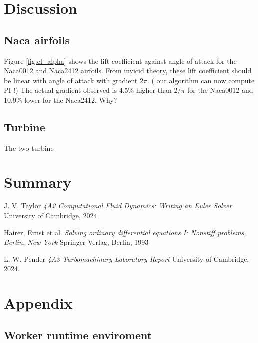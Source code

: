 \documentclass{article}
\begin{document}
\section{Discussion}

\subsection{Naca airfoils}

Figure \ref{fig:cl_alpha} shows the lift coefficient against angle of attack for the Naca0012 and Naca2412 airfoils.
From invicid theory, these lift coefficient should be linear with angle of attack with gradient $ 2\pi $. ( our algorithm can now compute PI !)
The actual gradient observed is 4.5\% higher than $2/\pi$ for the Naca0012 and 10.9\% lower for the Naca2412.
Why?

\subsection{Turbine}

The two turbine 

\section{Summary}

\begin{thebibliography}{9}

    J. V. Taylor
    \emph{4A2 Computational Fluid Dynamics: Writing an Euler Solver}
    University of Cambridge,
    2024.

    Hairer, Ernst et al.
    \emph{Solving ordinary differential equations I: Nonstiff problems, Berlin, New York}
    Springer-Verlag, Berlin, 1993

    L. W. Pender
    \emph{4A3 Turbomachinary Laboratory Report}
    University of Cambridge,
    2024.
  
\end{thebibliography}

\section{Appendix}

\subsection{Worker runtime enviroment}
\end{document}
